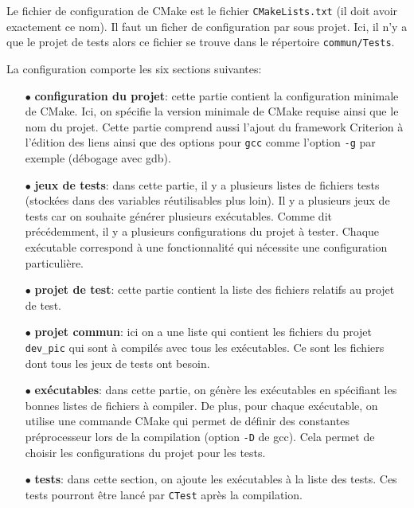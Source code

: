 \documentclass[a4paper]{article}
\begin{document}
Le fichier de configuration de CMake est le fichier \verb|CMakeLists.txt|
(il doit avoir exactement ce nom). Il faut un ficher de configuration par sous
projet. Ici, il n'y a que le projet de tests alors ce fichier se trouve dans le
répertoire \verb|commun/Tests|.

La configuration comporte les six sections suivantes:

\begin{itemize}
  \item[$\bullet$] \textbf{configuration du projet}: cette partie contient la
    configuration minimale de CMake. Ici, on spécifie la version minimale de
    CMake requise ainsi que le nom du projet. Cette partie comprend aussi
    l'ajout du framework Criterion à l'édition des liens ainsi que des options
    pour \verb|gcc| comme l'option \verb|-g| par exemple (débogage
    avec gdb).
  \item[$\bullet$] \textbf{jeux de tests}: dans cette partie, il y a plusieurs
    listes de fichiers tests (stockées dans des variables réutilisables plus
    loin). Il y a plusieurs jeux de tests car on souhaite générer plusieurs
    exécutables. Comme dit précédemment, il y a plusieurs configurations du
    projet à tester. Chaque exécutable correspond à une fonctionnalité qui
    nécessite une configuration particulière.
  \item[$\bullet$] \textbf{projet de test}: cette partie contient la liste des
    fichiers relatifs au projet de test.
  \item[$\bullet$] \textbf{projet commun}: ici on a une liste qui contient les
    fichiers du projet \verb|dev_pic| qui sont à compilés avec tous les
    exécutables. Ce sont les fichiers dont tous les jeux de tests ont besoin.
  \item[$\bullet$] \textbf{exécutables}: dans cette partie, on génère les
    exécutables en spécifiant les bonnes listes de fichiers à compiler. De plus,
    pour chaque exécutable, on utilise une commande CMake qui permet de définir
    des constantes préprocesseur lors de la compilation (option \verb|-D|
    de gcc). Cela permet de choisir les configurations du projet pour les tests.
  \item[$\bullet$] \textbf{tests}: dans cette section, on ajoute les exécutables
    à la liste des tests. Ces tests pourront être lancé par \verb|CTest|
    après la compilation.
\end{itemize}


\end{document}
